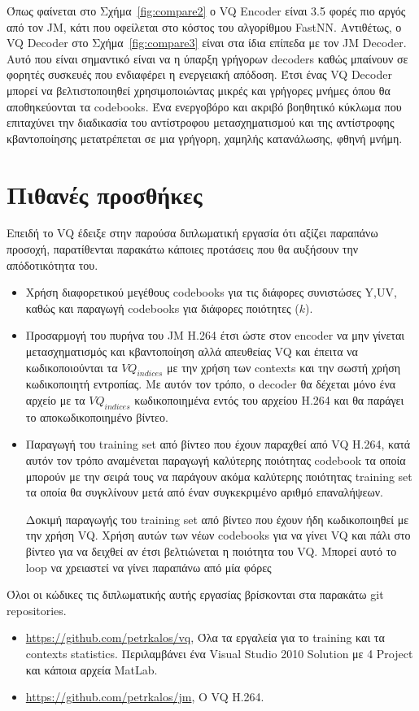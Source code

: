 \indent Όπως φαίνεται στο Σχήμα~\ref{fig:compare2}  ο VQ Encoder είναι 3.5 φορές πιο αργός από τον JM, κάτι που οφείλεται στο κόστος του αλγορίθμου FastNN. Αντιθέτως, ο VQ Decoder στο Σχήμα~\ref{fig:compare3} είναι στα ίδια επίπεδα με τον JM Decoder. Αυτό που είναι σημαντικό είναι να η ύπαρξη γρήγορων decoders καθώς μπαίνουν σε φορητές συσκευές που ενδιαφέρει η ενεργειακή απόδοση. Έτσι ένας VQ Decoder μπορεί να βελτιστοποιηθεί χρησιμοποιώντας μικρές και γρήγορες μνήμες όπου θα αποθηκεύονται τα codebooks. Ένα ενεργοβόρο και ακριβό βοηθητικό κύκλωμα που επιταχύνει την διαδικασία του αντίστροφου μετασχηματισμού και της αντίστροφης κβαντοποίησης μετατρέπεται σε μια γρήγορη, χαμηλής κατανάλωσης, φθηνή μνήμη.

\section{Πιθανές προσθήκες}
\label{section:sect63}

\indent Επειδή το VQ έδειξε στην παρούσα διπλωματική εργασία ότι αξίζει παραπάνω προσοχή, παρατίθενται παρακάτω κάποιες προτάσεις που θα αυξήσουν την απόδοτικότητα του.

\begin{itemize}

    \item Χρήση διαφορετικού μεγέθους codebooks για τις διάφορες συνιστώσες Y,UV, καθώς και παραγωγή codebooks για διάφορες ποιότητες ($k$).

    \item Προσαρμογή του πυρήνα του JM H.264 έτσι ώστε στον encoder να μην γίνεται μετασχηματισμός και κβαντοποίηση αλλά απευθείας VQ και έπειτα να κωδικοποιούνται τα $VQ_{indices}$ με την χρήση των contexts και την σωστή χρήση κωδικοποιητή εντροπίας. Με αυτόν τον τρόπο, ο decoder θα δέχεται μόνο ένα αρχείο με τα $VQ_{indices}$ κωδικοποιημένα εντός του αρχείου H.264 και θα παράγει το αποκωδικοποιημένο βίντεο.

    \item Παραγωγή του training set από βίντεο που έχουν παραχθεί από VQ H.264, κατά αυτόν τον τρόπο αναμένεται παραγωγή καλύτερης ποιότητας codebook τα οποία μπορούν με την σειρά τους να παράγουν ακόμα καλύτερης ποιότητας training set τα οποία θα συγκλίνουν μετά από έναν συγκεκριμένο αριθμό επαναλήψεων.
    
    Δοκιμή παραγωγής του training set από βίντεο που έχουν ήδη κωδικοποιηθεί με την χρήση VQ. Χρήση αυτών των νέων codebooks για να γίνει VQ και πάλι στο βίντεο για να δειχθεί αν έτσι βελτιώνεται η ποιότητα του VQ. Μπορεί αυτό το loop να χρειαστεί να γίνει παραπάνω από μία φόρες
\end{itemize}

\indent Όλοι οι κώδικες τις διπλωματικής αυτής εργασίας βρίσκονται στα παρακάτω git repositories.
\begin{itemize}
    \item \url{https://github.com/petrkalos/vq}, Όλα τα εργαλεία για το training και τα contexts statistics. Περιλαμβάνει ένα Visual Studio 2010 Solution με 4 Project και κάποια αρχεία MatLab.

    \item \url{https://github.com/petrkalos/jm}, Ο VQ H.264.
\end{itemize} 